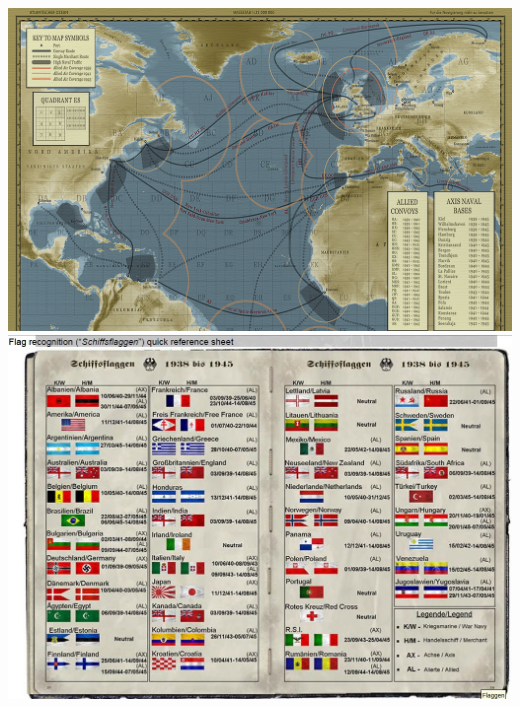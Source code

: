 \documentclass{article}
\begin{document}
\includegraphics[angle=90, width=\textwidth]{cmapETO}
\label{GWX Campaign Map}
\includegraphics[angle=90, width=\textwidth]{ETOFlags}



\end{document}
